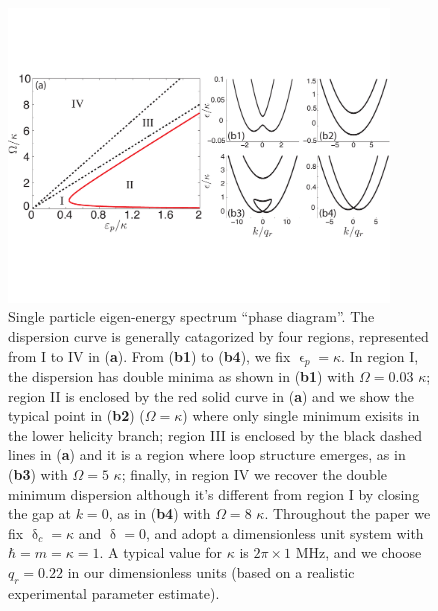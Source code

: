 \documentclass[atoms,article,accept,moreauthors,pdftex,12pt,a4paper]{mdpi}
\begin{document}
\begin{figure}[H]
\centering
\includegraphics[width=0.9\textwidth]{fig1}  \vspace{12pt}
\caption{Single particle eigen-energy spectrum ``phase diagram''.  The dispersion curve is generally catagorized by four regions, represented from I to IV in (\textbf{a}). From (\textbf{b1}) to (\textbf{b4}), we fix $\upvarepsilon_p=\kappa$. In region I, the dispersion has double minima as shown in (\textbf{b1}) with $\Omega=0.03$ $\kappa$; region II is enclosed by the red solid curve in (\textbf{a}) and we show the typical point in (\textbf{b2})  ($\Omega=\kappa$) where only single minimum exisits in the lower helicity branch; region III is enclosed by the black dashed lines in (\textbf{a}) and it is a region where loop structure emerges, as in (\textbf{b3}) with $\Omega=5$ $\kappa$; finally, in region IV we recover the double minimum dispersion although it's different from region I by closing the gap at $k=0$, as in (\textbf{b4}) with $\Omega=8$ $\kappa$. Throughout the paper we fix $\updelta_c=\kappa$ and $\updelta=0$, and adopt a dimensionless unit system with $\hbar=m=\kappa=1$. A typical value for $\kappa$ is $2\pi \times 1 \text{ MHz}$, and we choose $q_r = 0.22$ in our dimensionless units (based on a realistic experimental parameter estimate). }\label{fig1}
\end{figure}
\end{document}
